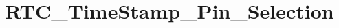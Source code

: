 \hypertarget{group___r_t_c___time_stamp___pin___selection}{\section{R\-T\-C\-\_\-\-Time\-Stamp\-\_\-\-Pin\-\_\-\-Selection}
\label{group___r_t_c___time_stamp___pin___selection}
}
